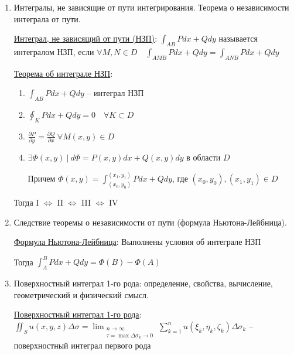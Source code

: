 \documentclass[12pt]{article}
\begin{document}
\begin{enumerate}
        \item Интегралы, не зависящие от пути интегрирования. Теорема о независимости интеграла от пути.

        \hyperlink{pathindependentintegrals}{Интеграл, не зависящий от пути (НЗП)}: $\int_{AB}Pdx + Qdy$ называется интегралом НЗП, если $\forall M, N \in D \quad \int_{AMB}Pdx + Qdy = \int_{ANB}Pdx + Qdy$

        \hyperlink{theorempathindependentintegrals}{Теорема об интеграле НЗП}:

        \begin{enumerate}[label=\Roman*.]

        \item $\int_{AB} Pdx + Qdy$ -- интеграл НЗП

        \item $\oint_K Pdx + Qdy = 0 \quad \forall K \subset D$

        \item $\frac{\partial P}{\partial y} = \frac{\partial Q}{\partial x} \ \forall M(x, y) \in D$

        \item $\exists \Phi(x, y) \ | \ d\Phi = P(x, y)dx + Q(x, y)dy$ в области $D$

        Причем $\Phi(x, y) = \int_{(x_0,y_0)}^{(x_1,y_1)}Pdx+Qdy$, где $(x_0, y_0), (x_1,y_1) \in D$

        \end{enumerate}

        Тогда I $\Longleftrightarrow$ II $\Longleftrightarrow$ III $\Longleftrightarrow$ IV

        \item Следствие теоремы о независимости от пути (формула Ньютона-Лейбница).

        \hyperlink{theoremNewtonLeibnizforpathindependantintegral}{Формула Ньютона-Лейбница}:
        Выполнены условия \Ths об интеграле НЗП

        Тогда $\int_A^B Pdx + Qdy = \Phi(B) - \Phi(A)$

        \item Поверхностный интеграл 1-го рода: определение, свойства, вычисление, геометрический и физический смысл.

        \hyperlink{surfaceintegraloffirstkind}{Поверхностный интеграл 1-го рода}:
        $\iint_S u(x, y, z) \Delta \sigma = \lim_{\substack{n \to \infty \\ \tau = \max \Delta \sigma_k \to 0}} \sum_{k = 1}^{n} u(\xi_k, \eta_k, \zeta_k) \Delta \sigma_k$ -- поверхностный интеграл первого рода


\end{enumerate}
\end{document}
